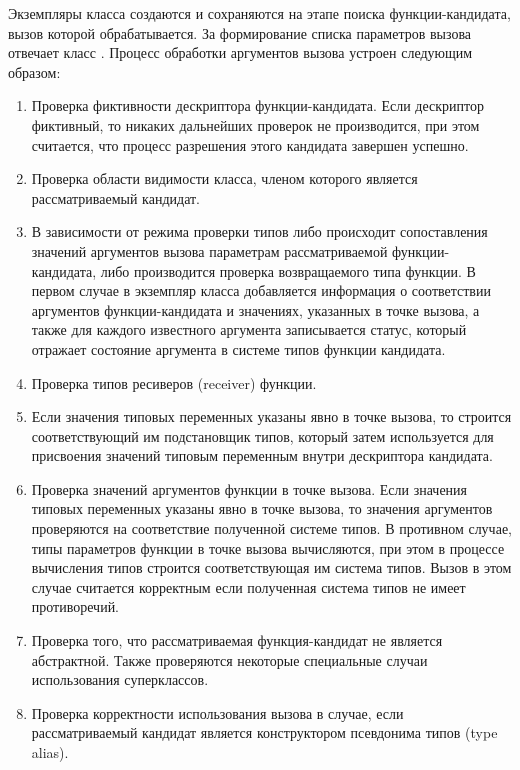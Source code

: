 Экземпляры класса  создаются и сохраняются на этапе поиска функции-кандидата, вызов которой обрабатывается. За формирование списка параметров вызова отвечает класс . Процесс обработки аргументов вызова устроен следующим образом:
\begin{enumerate}
    \item Проверка фиктивности дескриптора функции-кандидата. Если дескриптор фиктивный, то никаких дальнейших проверок не производится, при этом считается, что процесс разрешения этого кандидата завершен успешно.  
    \item Проверка области видимости класса, членом которого является рассматриваемый кандидат. 
    \item В зависимости от режима проверки типов либо происходит сопоставления значений аргументов вызова параметрам рассматриваемой функции-кандидата, либо производится проверка возвращаемого типа функции. В первом случае в экземпляр класса  добавляется информация о соответствии аргументов функции-кандидата и значениях, указанных в точке вызова, а также для каждого известного аргумента записывается статус, который отражает состояние аргумента в системе типов функции кандидата.  
    \item Проверка типов ресиверов (receiver) функции.
    \item Если значения типовых переменных указаны явно в точке вызова, то строится соответствующий им подстановщик типов, который затем используется для присвоения значений типовым переменным внутри дескриптора кандидата.
    \item Проверка значений аргументов функции в точке вызова. Если значения типовых переменных указаны явно в точке вызова, то значения аргументов проверяются на соответствие полученной системе типов. В противном случае, типы параметров функции в точке вызова вычисляются, при этом в процессе вычисления типов строится соответствующая им система типов. Вызов в этом случае считается корректным если полученная система типов не имеет противоречий.      
    \item Проверка того, что рассматриваемая функция-кандидат не является абстрактной. Также проверяются некоторые специальные случаи использования суперклассов. 
    \item Проверка корректности использования вызова в случае, если рассматриваемый кандидат является конструктором псевдонима типов (type alias). 
\end{enumerate}

